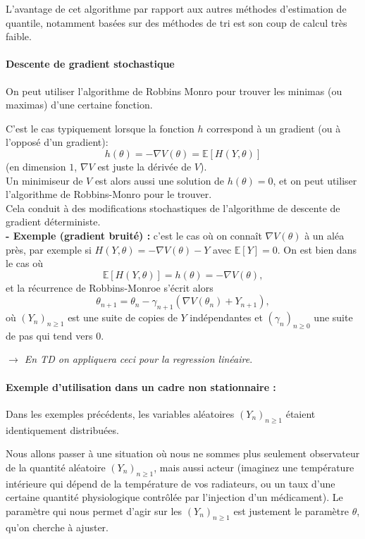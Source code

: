 \documentclass[a4paper,12pt]{book}
\begin{document}
L'avantage de cet algorithme par rapport aux autres méthodes d'estimation de quantile, notamment basées sur des méthodes de tri est son coup de calcul très faible.


\paragraph{Descente de gradient stochastique}
On peut utiliser l'algorithme de Robbins Monro pour trouver les minimas (ou maximas) d'une certaine fonction.

C'est le cas typiquement lorsque la fonction $h$ correspond à un gradient (ou à l'opposé d'un gradient):
$$h(\theta)=-\nabla V(\theta)=\mathbb{E}[H(Y,\theta)]$$
(en dimension $1$, $\nabla V$ est juste la dérivée de
$V$). \\
Un minimiseur de $V$ est alors aussi une solution de $h(\theta)=0$, et on peut utiliser l'algorithme de Robbins-Monro pour le trouver. \\
Cela conduit à des modifications stochastiques de l'algorithme de descente de gradient déterministe.\\
\textbf{ - Exemple (gradient bruité) :} c'est le cas où on connaît $\nabla V(\theta)$ à un aléa près, par exemple si $H(Y,\theta)=-\nabla V(\theta)-Y$ avec $\mathbb{E}[Y]=0$. On est bien dans le cas où
$$\mathbb{E}[H(Y,\theta)]=h(\theta)=-\nabla V(\theta),$$
et la récurrence de Robbins-Monroe s'écrit alors
$$\theta_{n+1}=\theta_n-\gamma_{n+1} (\nabla V(\theta_n)+Y_{n+1}),$$
où $(Y_n)_{n\geq 1}$ est une suite de copies de $Y$ indépendantes et $(\gamma_n)_{n\geq 0}$ une suite de pas  qui tend vers $0$.


\textit{$\rightarrow$ En TD on appliquera ceci pour la regression linéaire}.



\paragraph{Exemple d'utilisation dans un cadre non stationnaire :}
Dans les exemples précédents, les variables aléatoires $(Y_n)_{n\geq 1}$ étaient identiquement distribuées.

Nous allons passer à une situation où nous ne sommes plus seulement observateur de la quantité aléatoire $(Y_n)_{n\geq 1}$, mais aussi acteur (imaginez une température intérieure qui dépend de la température de vos radiateurs, ou un taux d'une certaine quantité physiologique contrôlée par l'injection d'un médicament). Le paramètre qui nous permet d'agir sur les $(Y_n)_{n\geq 1}$ est justement le paramètre $\theta$, qu'on cherche à ajuster.
\end{document}
